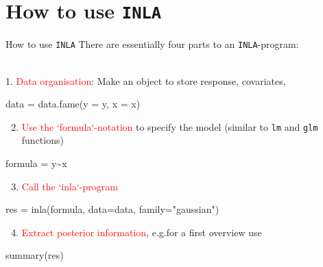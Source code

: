 \documentclass[
  ignorenonframetext,
]{beamer}
\newenvironment{Shaded}{\begin{snugshade}}{\end{snugshade}}
\newcommand{\AttributeTok}[1]{\textcolor[rgb]{0.77,0.63,0.00}{#1}}
\newcommand{\FunctionTok}[1]{\textcolor[rgb]{0.00,0.00,0.00}{#1}}
\newcommand{\NormalTok}[1]{#1}
\newcommand{\OtherTok}[1]{\textcolor[rgb]{0.56,0.35,0.01}{#1}}
\newcommand{\SpecialCharTok}[1]{\textcolor[rgb]{0.00,0.00,0.00}{#1}}
\newcommand{\StringTok}[1]{\textcolor[rgb]{0.31,0.60,0.02}{#1}}
\providecommand{\tightlist}{%
  \setlength{\itemsep}{0pt}\setlength{\parskip}{0pt}}
\begin{document}
\hypertarget{how-to-use-inla}{%
\section{\texorpdfstring{How to use
\texttt{INLA}}{How to use INLA}}\label{how-to-use-inla}}

\begin{frame}[fragile]{How to use \texttt{INLA}}
\protect\hypertarget{how-to-use-inla-1}{}
There are essentially four parts to an \texttt{INLA}-program:\\
\strut \\
1. \textcolor{red}{Data organisation}: Make an object to store response,
covariates,

\begin{Shaded}
\begin{Highlighting}[]
\NormalTok{data }\OtherTok{=} \FunctionTok{data.fame}\NormalTok{(}\AttributeTok{y =}\NormalTok{ y, }\AttributeTok{x =}\NormalTok{ x)}
\end{Highlighting}
\end{Shaded}

\begin{enumerate}
\setcounter{enumi}{1}
\tightlist
\item
  \textcolor{red}{Use the `formula`-notation} to specify the model
  (similar to \texttt{lm} and \texttt{glm} functions)
\end{enumerate}

\begin{Shaded}
\begin{Highlighting}[]
\NormalTok{formula }\OtherTok{=}\NormalTok{ y}\SpecialCharTok{\textasciitilde{}}\NormalTok{x}
\end{Highlighting}
\end{Shaded}

\begin{enumerate}
\setcounter{enumi}{2}
\tightlist
\item
  \textcolor{red}{Call the `inla`-program}
\end{enumerate}

\begin{Shaded}
\begin{Highlighting}[]
\NormalTok{res }\OtherTok{=} \FunctionTok{inla}\NormalTok{(formula, }\AttributeTok{data=}\NormalTok{data, }\AttributeTok{family=}\StringTok{"gaussian"}\NormalTok{)}
\end{Highlighting}
\end{Shaded}

\begin{enumerate}
\setcounter{enumi}{3}
\tightlist
\item
  \textcolor{red}{Extract posterior information}, e.g.for a first
  overview use
\end{enumerate}

\begin{Shaded}
\begin{Highlighting}[]
\FunctionTok{summary}\NormalTok{(res)}
\end{Highlighting}
\end{Shaded}
\end{frame}
\end{document}
